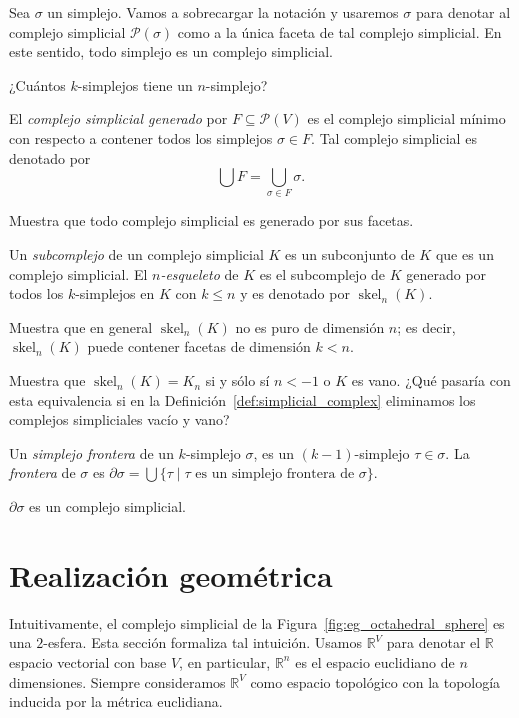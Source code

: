 \documentclass{standalone}
\begin{document}
	Sea $\sigma$ un simplejo. Vamos a sobrecargar la notación y usaremos $\sigma$ para denotar al complejo simplicial $\mathcal{P}(\sigma)$ como a la única faceta de tal complejo simplicial. En este sentido, todo simplejo es un complejo simplicial.
	
	\begin{exercise}
		¿Cuántos $k$-simplejos tiene un $n$-simplejo?
	\end{exercise}
	
	El \emph{complejo simplicial generado} por $F\subseteq\mathcal{P}(V)$ es el complejo simplicial mínimo con respecto a contener todos los simplejos $\sigma\in F$. Tal complejo simplicial es denotado por 
	\[
	\bigcup F=\bigcup_{\sigma\in F}\sigma.
	\]
	
	\begin{exercise}
		Muestra que todo complejo simplicial es generado por sus facetas.
	\end{exercise}
	
	Un \emph{subcomplejo} de un complejo simplicial $K$ es un subconjunto de $K$ que es un complejo simplicial. El \emph{$n$-esqueleto} de $K$ es el subcomplejo de $K$ generado por todos los $k$-simplejos en $K$ con $k\leq n$ y es denotado por $\operatorname{skel}_{n}(K)$.
	
	\begin{exercise}
		Muestra que en general $\operatorname{skel}_{n}(K)$ no es puro de dimensión $n$; es decir, $\operatorname{skel}_{n}(K)$ puede contener facetas de dimensión $k < n$.
	\end{exercise}
	
	\begin{exercise}
		Muestra que $\operatorname{skel}_{n}(K)=K_{n}$ si y sólo sí $n<-1$ o $K$ es vano. ¿Qué pasaría con esta equivalencia si en la Definición~\ref{def:simplicial_complex} eliminamos los complejos simpliciales vacío y vano?
	\end{exercise}	
	
	Un \emph{simplejo frontera} de un $k$-simplejo $\sigma$, es un $(k-1)$-simplejo $\tau\in\sigma$. La \emph{frontera} de $\sigma$ es $\partial\sigma=\bigcup\{\tau\mid\tau\text{ es un simplejo frontera de }\sigma\}$.
	
	\begin{exercise}
		$\partial\sigma$ es un complejo simplicial.
	\end{exercise}
	
	\section{Realización geométrica}
	\noindent Intuitivamente, el complejo simplicial de la Figura~\ref{fig:eg_octahedral_sphere} es una $2$-esfera. Esta sección formaliza tal intuición. Usamos $\mathbb{R}^{V}$ para denotar el $\mathbb{R}$ espacio vectorial con base $V$, en particular, $\mathbb{R}^{n}$ es el espacio euclidiano de $n$ dimensiones. Siempre consideramos $\mathbb{R}^{V}$ como espacio topológico con la topología inducida por la métrica euclidiana.
	
\end{document}
